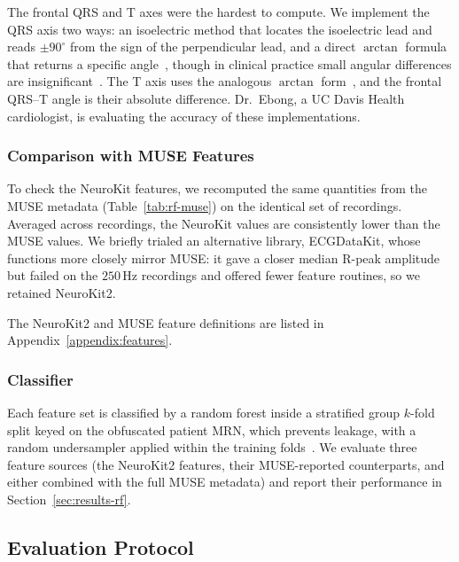 \documentclass[sigconf,nonacm]{acmart}
\begin{document}
The frontal QRS and T axes were the hardest to compute. We implement the QRS
axis two ways: an isoelectric method that locates the isoelectric lead and
reads $\pm90^\circ$ from the sign of the perpendicular lead, and a direct
$\arctan$ formula that returns a specific
angle~\cite{noauthor_calculating_2022, noauthor_visualising_nodate},
though in clinical practice small angular differences are
insignificant~\cite{noauthor_calculating_2022}. The T axis uses the
analogous $\arctan$ form~\cite{scherer_abnormal_2009}, and the frontal
QRS--T angle is their absolute difference. Dr.~Ebong, a UC Davis Health
cardiologist, is evaluating the accuracy of these implementations.

\subsubsection{Comparison with MUSE Features}

To check the NeuroKit features, we recomputed the same quantities from the
MUSE metadata (Table~\ref{tab:rf-muse}) on the identical set of recordings.
Averaged across recordings, the NeuroKit values are consistently lower than
the MUSE values. We briefly trialed an alternative library, ECGDataKit, whose
functions more closely mirror MUSE: it gave a closer median R-peak amplitude
but failed on the $250$\,Hz recordings and offered fewer feature routines, so
we retained NeuroKit2.

The NeuroKit2 and MUSE feature definitions are listed in
Appendix~\ref{appendix:features}.

\subsubsection{Classifier}

Each feature set is classified by a random forest inside a stratified group
$k$-fold split keyed on the obfuscated patient MRN, which prevents leakage,
with a random undersampler applied within the training folds~\cite{batista_study_2004, lemaitre_imbalanced-learn_2017}. We evaluate
three feature sources (the NeuroKit2 features, their MUSE-reported
counterparts, and either combined with the full MUSE metadata) and report
their performance in Section~\ref{sec:results-rf}.

\subsection{Evaluation Protocol}
\label{sec:eval}
\end{document}
